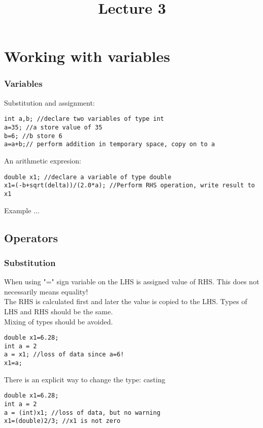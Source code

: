 \documentclass[10pt]{beamer}
\title{Lecture 3}
\date{}
\begin{document}
\frame{
    \titlepage
}


\section{Working with variables}

\begin{frame}[fragile]
  \frametitle{Variables}
  \centering
Substitution and assignment:
    \begin{lstlisting}
int a,b; //declare two variables of type int
a=35; //a store value of 35
b=6; //b store 6
a=a+b;// perform addition in temporary space, copy on to a
    \end{lstlisting}

An arithmetic expresion:
    \begin{lstlisting}
double x1; //declare a variable of type double
x1=(-b+sqrt(delta))/(2.0*a); //Perform RHS operation, write result to x1
    \end{lstlisting}

Example ...

\end{frame}

\subsection{Operators}

\begin{frame}[fragile]
  \frametitle{Substitution}
  \centering
  When using "=" sign variable on the LHS is assigned value of RHS. This does not necessarily means equality!\\
  The RHS is calculated first and later the value is copied to the LHS. Types of LHS and RHS should be the same.\\
  Mixing of types should be avoided.\\
\begin{lstlisting}
double x1=6.28;
int a = 2
a = x1; //loss of data since a=6!
x1=a;
\end{lstlisting}
There is an explicit way to change the type: casting
\begin{lstlisting}
double x1=6.28;
int a = 2
a = (int)x1; //loss of data, but no warning
x1=(double)2/3; //x1 is not zero
\end{lstlisting}


\end{frame}
\end{document}
